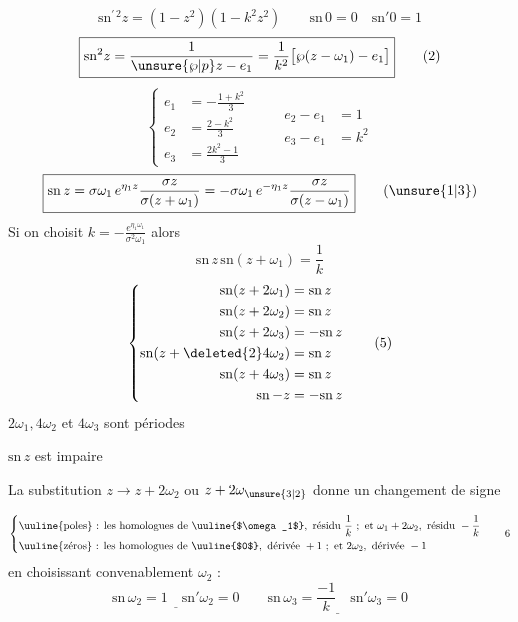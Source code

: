 
\[
\boxed{\mathrm{sn}^{\prime\,2}z=(1-z^2)(1-k^2z^2)}\qquad \mathrm{sn}\,0=0\quad \mathrm{sn}'0=1 \tag*{(1)}
\]
\[
\boxed{\mathrm{sn}^2z=\frac{1}{\unsure{\wp|p}z-e_1}=\frac1{k^2}\bigl[\wp(z-\omega_1)-e_1\bigr]}\tag*{(2)}
\]
\[
\left\{\begin{aligned}
e_1&=-\frac{1+k^2}{3}\\
e_2&=\frac{2-k^2}{3}\\
e_3&=\frac{2k^2-1}{3}
\end{aligned}\right.
\qquad\begin{aligned}e_2-e_1&=1\\e_3-e_1&=k^2\end{aligned}
\]
\[
\boxed{\mathrm{sn}\,z=\sigma\omega_1\,e^{\eta_1 z}\frac{\sigma z}{\sigma(z+\omega_1)}
=-\sigma\omega_1\,e^{-\eta_1z}\frac{\sigma z}{\sigma(z-\omega_1)}}\tag*{(\unsure{1|3})}
\]
Si on choisit \uline{$k=-\frac{e^{\eta_1\omega_1}}{\sigma^2\omega_1}$} alors
\[
\boxed{\mathrm{sn}\,z\,\mathrm{sn}(z+\omega_1)=\frac1k}\tag*{(4)}
\]
\[
\left\{\begin{aligned}
\mathrm{sn}(z+2\omega_1)&=\mathrm{sn}\,z\\
\mathrm{sn}(z+2\omega_2)&=\mathrm{sn}\,z\\
\mathrm{sn}(z+2\omega_3)&=-\mathrm{sn}\,z\\
\mathrm{sn}(z+\deleted{2}4\omega_2)&=\mathrm{sn}\,z\\
\mathrm{sn}(z+4\omega_3)&=\mathrm{sn}\,z\\
\mathrm{sn}\,{-z}&=-\mathrm{sn}\,z
\end{aligned}\right.\tag*{(5)}
\]
$2\omega_1,4\omega_2$ et $4\omega_3$ sont périodes

$\mathrm{sn}\,z$ est impaire

La substitution $z\to z+2\omega_2$ ou $z+2\omega_{\unsure{3|2}}$ donne un changement de signe

\[
\left\{\begin{aligned}
&\text{\uuline{poles} : les homologues de }\text{\uuline{$\omega_1$}},\ \text{résidu }\frac1k\ ;\ \text{et }\omega_1+2\omega_2,\ \text{résidu }-\frac1k\\
&\text{\uuline{zéros} : les homologues de }\text{\uuline{$0$}},\ \text{dérivée }+1\ ;\ \text{et }2\omega_2,\ \text{dérivée }-1
\end{aligned}\right.\tag*{6}
\]
en choisissant convenablement $\omega_{2}$ :
\[
\underline{\mathrm{sn}\,\omega_2=1\quad\mathrm{sn}'\omega_2=0}
\qquad\underline{\mathrm{sn}\,\omega_3=\frac{-1}{k}\quad\mathrm{sn}'\omega_3=0}
\]

